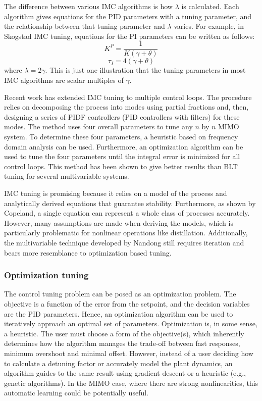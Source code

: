 The difference between various IMC algorithms is how $\lambda$ is calculated. Each algorithm gives equations for the PID parameters with a tuning parameter, and the relationship between that tuning parameter and $\lambda$ varies. For example, in Skogstad IMC tuning, equations for the PI parameters can be written as follows\citep{Copeland2010}: 
\begin{equation}
    K^P = \frac{1}{K(\gamma +\theta)}
\end{equation}
\begin{equation}
    \tau_I = 4(\gamma+\theta)
\end{equation}
where $\lambda=2\gamma$. This is just one illustration that the tuning parameters in most IMC algorithms are scalar multiples of $\gamma$.

Recent work has extended IMC tuning to multiple control loops.\citep{Nandong2013, Nandong2015} The procedure relies on decomposing the process into modes using partial fractions and, then, designing a series of PIDF controllers (PID controllers with filters) for these modes. The method uses four overall parameters to tune any $n$ by $n$ MIMO system. To determine these four parameters, a heuristic based on frequency domain analysis can be used. Furthermore, an optimization algorithm can be used to tune the four parameters until the integral error is minimized for all control loops. This method has been shown to give better results than BLT tuning for several  multivariable systems.  

IMC tuning is promising because it relies on a model of the process and analytically derived equations that guarantee stability. Furthermore, as shown by Copeland, a single equation can represent a whole class of processes accurately.\citep{Copeland2010} However, many assumptions are made when deriving the models, which is particularly problematic for nonlinear operations like distillation. Additionally, the multivariable technique developed by Nandong\citep{Nandong2015} still requires iteration and bears more resemblance to optimization based tuning.

\subsubsection{Optimization tuning}
The control tuning problem can be posed as an optimization problem.  The objective is a function of the error from the setpoint\citep{Pajares2019, Sumana2010, Rajapandiyan2012, Behroozsarand2012}, and the decision variables  are the PID parameters.  Hence, an optimization algorithm can be used to iteratively approach an optimal set of parameters. Optimization is, in some sense, a heuristic. The user must choose a form of the objective(s), which inherently determines how the algorithm manages the trade-off between fast responses, minimum overshoot and minimal offset. However, instead of a user deciding how to calculate a detuning factor or accurately model the plant dynamics, an algorithm guides to the same result using gradient descent or a heuristic (e.g., genetic algorithms). In the MIMO case, where there are strong nonlinearities, this automatic learning could be potentially useful. 

